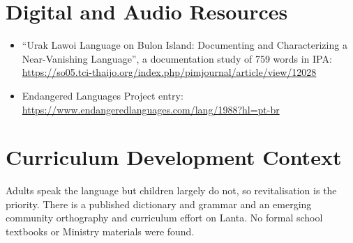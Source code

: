 \documentclass[12pt]{article}
\begin{document}
\section{Digital and Audio Resources}
\begin{itemize}
\item ``Urak Lawoi Language on Bulon Island: Documenting and Characterizing a Near-Vanishing Language'', a documentation study of 759 words in IPA: \url{https://so05.tci-thaijo.org/index.php/pimjournal/article/view/12028}
\item Endangered Languages Project entry: \url{https://www.endangeredlanguages.com/lang/1988?hl=pt-br}
\end{itemize}

\section{Curriculum Development Context}
Adults speak the language but children largely do not, so revitalisation is the priority. There is a published dictionary and grammar and an emerging community orthography and curriculum effort on Lanta. No formal school textbooks or Ministry materials were found.
\end{document}
